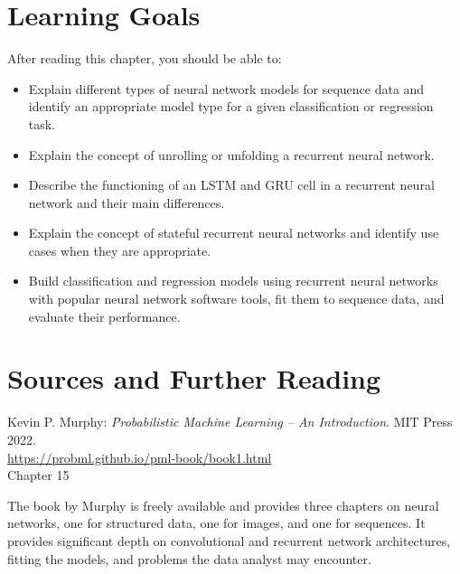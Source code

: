 %
%
\section*{Learning Goals}

After reading this chapter, you should be able to:
\begin{itemize}
   \item Explain different types of neural network models for sequence data and identify an appropriate model type for a given classification or regression task. 
   \item Explain the concept of unrolling or unfolding a recurrent neural network.
   \item Describe the functioning of an LSTM and GRU cell in a recurrent neural network and their main differences. 
   \item Explain the concept of stateful recurrent neural networks and identify use cases when they are appropriate.
   \item Build classification and regression models using recurrent neural networks with popular neural network software tools, fit them to sequence data, and evaluate their performance.
\end{itemize}

\section*{Sources and Further Reading}

\begin{tcolorbox}[colback=alert]
Kevin P. Murphy: \emph{Probabilistic Machine Learning -- An Introduction}. MIT Press 2022. \\

\url{https://probml.github.io/pml-book/book1.html} \\

Chapter 15

\end{tcolorbox}

The book by Murphy is freely available and provides three chapters on neural networks, one for structured data, one for images, and one for sequences. It provides significant depth on convolutional and recurrent network architectures, fitting the models, and problems the data analyst may encounter. 


